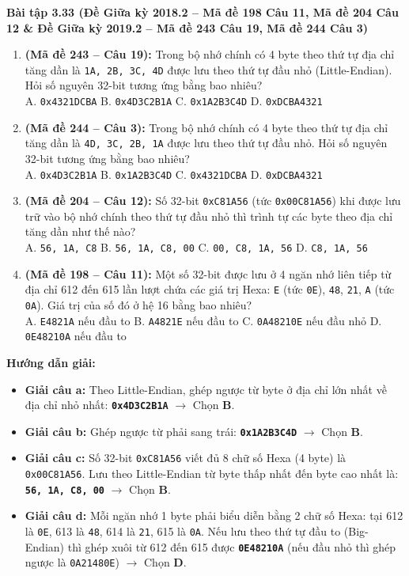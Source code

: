 \textbf{Bài tập 3.33 (Đề Giữa kỳ 2018.2 -- Mã đề 198 Câu 11, Mã đề 204 Câu 12 \& Đề Giữa kỳ 2019.2 -- Mã đề 243 Câu 19, Mã đề 244 Câu 3)}
\begin{enumerate}[label=\alph*)]
    \item \textbf{(Mã đề 243 -- Câu 19):} Trong bộ nhớ chính có 4 byte theo thứ tự địa chỉ tăng dần là \texttt{1A, 2B, 3C, 4D} được lưu theo thứ tự đầu nhỏ (Little-Endian). Hỏi số nguyên 32-bit tương ứng bằng bao nhiêu?\\
    A. \texttt{0x4321DCBA} \quad B. \texttt{0x4D3C2B1A} \quad C. \texttt{0x1A2B3C4D} \quad D. \texttt{0xDCBA4321}
    \item \textbf{(Mã đề 244 -- Câu 3):} Trong bộ nhớ chính có 4 byte theo thứ tự địa chỉ tăng dần là \texttt{4D, 3C, 2B, 1A} được lưu theo thứ tự đầu nhỏ. Hỏi số nguyên 32-bit tương ứng bằng bao nhiêu?\\
    A. \texttt{0x4D3C2B1A} \quad B. \texttt{0x1A2B3C4D} \quad C. \texttt{0x4321DCBA} \quad D. \texttt{0xDCBA4321}
    \item \textbf{(Mã đề 204 -- Câu 12):} Số 32-bit \texttt{0xC81A56} (tức \texttt{0x00C81A56}) khi được lưu trữ vào bộ nhớ chính theo thứ tự đầu nhỏ thì trình tự các byte theo địa chỉ tăng dần như thế nào?\\
    A. \texttt{56, 1A, C8} \quad B. \texttt{56, 1A, C8, 00} \quad C. \texttt{00, C8, 1A, 56} \quad D. \texttt{C8, 1A, 56}
    \item \textbf{(Mã đề 198 -- Câu 11):} Một số 32-bit được lưu ở 4 ngăn nhớ liên tiếp từ địa chỉ 612 đến 615 lần lượt chứa các giá trị Hexa: \texttt{E} (tức \texttt{0E}), \texttt{48}, \texttt{21}, \texttt{A} (tức \texttt{0A}). Giá trị của số đó ở hệ 16 bằng bao nhiêu?\\
    A. \texttt{E4821A} nếu đầu to \quad B. \texttt{A4821E} nếu đầu to \quad C. \texttt{0A48210E} nếu đầu nhỏ \quad D. \texttt{0E48210A} nếu đầu to
\end{enumerate}
\textbf{Hướng dẫn giải:}
\begin{itemize}
    \item \textbf{Giải câu a:} Theo Little-Endian, ghép ngược từ byte ở địa chỉ lớn nhất về địa chỉ nhỏ nhất: \textbf{\texttt{0x4D3C2B1A}} $\rightarrow$ Chọn \textbf{B}.
    \item \textbf{Giải câu b:} Ghép ngược từ phải sang trái: \textbf{\texttt{0x1A2B3C4D}} $\rightarrow$ Chọn \textbf{B}.
    \item \textbf{Giải câu c:} Số 32-bit \texttt{0xC81A56} viết đủ 8 chữ số Hexa (4 byte) là \texttt{0x00C81A56}. Lưu theo Little-Endian từ byte thấp nhất đến byte cao nhất là: \textbf{\texttt{56, 1A, C8, 00}} $\rightarrow$ Chọn \textbf{B}.
    \item \textbf{Giải câu d:} Mỗi ngăn nhớ 1 byte phải biểu diễn bằng 2 chữ số Hexa: tại 612 là \texttt{0E}, 613 là \texttt{48}, 614 là \texttt{21}, 615 là \texttt{0A}. Nếu lưu theo thứ tự đầu to (Big-Endian) thì ghép xuôi từ 612 đến 615 được \textbf{\texttt{0E48210A}} (nếu đầu nhỏ thì ghép ngược là \texttt{0A21480E}) $\rightarrow$ Chọn \textbf{D}.
\end{itemize}

